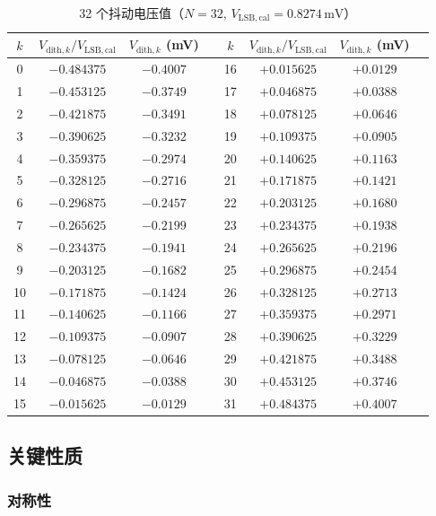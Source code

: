 \documentclass[UTF8,a4paper,11pt]{ctexart}
\newcommand{\Vlsb}{V_{\mathrm{LSB,cal}}}
\begin{document}
\begin{table}[H]
\centering
\caption{32 个抖动电压值（$N=32$, $\Vlsb = 0.8274\,\mathrm{mV}$）}
\label{tab:dither_values}
\small
\begin{tabularx}{\textwidth}{c c c X c c c X}
\toprule
$k$ & $V_{\mathrm{dith},k}/\Vlsb$ & $V_{\mathrm{dith},k}$ (mV) & & $k$ & $V_{\mathrm{dith},k}/\Vlsb$ & $V_{\mathrm{dith},k}$ (mV) & \\
\midrule
0  & $-0.484375$ & $-0.4007$ & & 16 & $+0.015625$ & $+0.0129$ & \\
1  & $-0.453125$ & $-0.3749$ & & 17 & $+0.046875$ & $+0.0388$ & \\
2  & $-0.421875$ & $-0.3491$ & & 18 & $+0.078125$ & $+0.0646$ & \\
3  & $-0.390625$ & $-0.3232$ & & 19 & $+0.109375$ & $+0.0905$ & \\
4  & $-0.359375$ & $-0.2974$ & & 20 & $+0.140625$ & $+0.1163$ & \\
5  & $-0.328125$ & $-0.2716$ & & 21 & $+0.171875$ & $+0.1421$ & \\
6  & $-0.296875$ & $-0.2457$ & & 22 & $+0.203125$ & $+0.1680$ & \\
7  & $-0.265625$ & $-0.2199$ & & 23 & $+0.234375$ & $+0.1938$ & \\
8  & $-0.234375$ & $-0.1941$ & & 24 & $+0.265625$ & $+0.2196$ & \\
9  & $-0.203125$ & $-0.1682$ & & 25 & $+0.296875$ & $+0.2454$ & \\
10 & $-0.171875$ & $-0.1424$ & & 26 & $+0.328125$ & $+0.2713$ & \\
11 & $-0.140625$ & $-0.1166$ & & 27 & $+0.359375$ & $+0.2971$ & \\
12 & $-0.109375$ & $-0.0907$ & & 28 & $+0.390625$ & $+0.3229$ & \\
13 & $-0.078125$ & $-0.0646$ & & 29 & $+0.421875$ & $+0.3488$ & \\
14 & $-0.046875$ & $-0.0388$ & & 30 & $+0.453125$ & $+0.3746$ & \\
15 & $-0.015625$ & $-0.0129$ & & 31 & $+0.484375$ & $+0.4007$ & \\
\bottomrule
\end{tabularx}
\end{table}

\subsection{关键性质}

\subsubsection{对称性}
\end{document}
